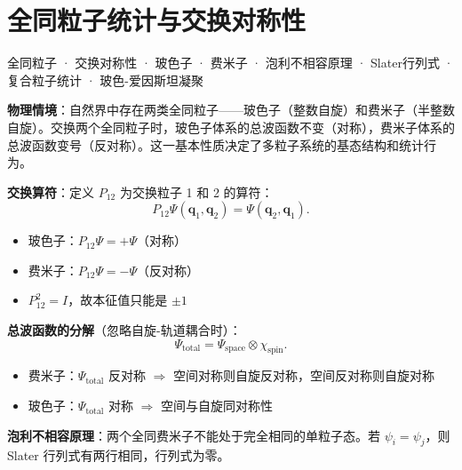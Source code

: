 
\section{全同粒子统计与交换对称性}
\label{sec:identical-particles}

\begin{tipbox}[关键词标签]
全同粒子 · 交换对称性 · 玻色子 · 费米子 · 泡利不相容原理 · Slater行列式 · 复合粒子统计 · 玻色-爱因斯坦凝聚
\end{tipbox}

\begin{modelbox}[模型：多粒子系统的交换对称性]
\textbf{物理情境}：自然界中存在两类全同粒子——玻色子（整数自旋）和费米子（半整数自旋）。交换两个全同粒子时，玻色子体系的总波函数不变（对称），费米子体系的总波函数变号（反对称）。这一基本性质决定了多粒子系统的基态结构和统计行为。

\textbf{交换算符}：定义 $P_{12}$ 为交换粒子 1 和 2 的算符：
\[
P_{12}\Psi(\mathbf{q}_1,\mathbf{q}_2)=\Psi(\mathbf{q}_2,\mathbf{q}_1).
\]
\begin{itemize}[nosep]
    \item 玻色子：$P_{12}\Psi=+\Psi$（对称）
    \item 费米子：$P_{12}\Psi=-\Psi$（反对称）
    \item $P_{12}^2=I$，故本征值只能是 $\pm1$
\end{itemize}

\textbf{总波函数的分解}（忽略自旋-轨道耦合时）：
\[
\Psi_{\text{total}}=\Psi_{\text{space}}\otimes\chi_{\text{spin}}.
\]
\begin{itemize}[nosep]
    \item 费米子：$\Psi_{\text{total}}$ 反对称 $\Rightarrow$ 空间对称则自旋反对称，空间反对称则自旋对称
    \item 玻色子：$\Psi_{\text{total}}$ 对称 $\Rightarrow$ 空间与自旋同对称性
\end{itemize}

\textbf{泡利不相容原理}：两个全同费米子不能处于完全相同的单粒子态。若 $\psi_i=\psi_j$，则 Slater 行列式有两行相同，行列式为零。
\end{modelbox}

